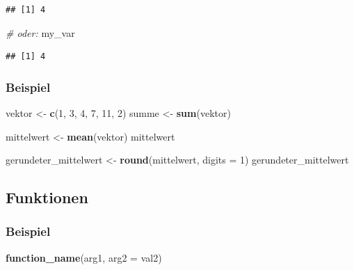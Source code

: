 \documentclass[
]{article}
\newenvironment{Shaded}{\begin{snugshade}}{\end{snugshade}}
\newcommand{\AttributeTok}[1]{\textcolor[rgb]{0.13,0.29,0.53}{#1}}
\newcommand{\CommentTok}[1]{\textcolor[rgb]{0.56,0.35,0.01}{\textit{#1}}}
\newcommand{\DecValTok}[1]{\textcolor[rgb]{0.00,0.00,0.81}{#1}}
\newcommand{\FunctionTok}[1]{\textcolor[rgb]{0.13,0.29,0.53}{\textbf{#1}}}
\newcommand{\NormalTok}[1]{#1}
\newcommand{\OtherTok}[1]{\textcolor[rgb]{0.56,0.35,0.01}{#1}}
\begin{document}
\begin{verbatim}
## [1] 4
\end{verbatim}

\begin{Shaded}
\begin{Highlighting}[]
\CommentTok{\# oder:}
\NormalTok{my\_var}
\end{Highlighting}
\end{Shaded}

\begin{verbatim}
## [1] 4
\end{verbatim}

\hypertarget{beispiel}{%
\subsubsection{Beispiel}\label{beispiel}}

\begin{Shaded}
\begin{Highlighting}[]
\NormalTok{vektor }\OtherTok{\textless{}{-}} \FunctionTok{c}\NormalTok{(}\DecValTok{1}\NormalTok{, }\DecValTok{3}\NormalTok{, }\DecValTok{4}\NormalTok{, }\DecValTok{7}\NormalTok{, }\DecValTok{11}\NormalTok{, }\DecValTok{2}\NormalTok{)}
\NormalTok{summe }\OtherTok{\textless{}{-}} \FunctionTok{sum}\NormalTok{(vektor)}

\NormalTok{mittelwert }\OtherTok{\textless{}{-}} \FunctionTok{mean}\NormalTok{(vektor)}
\NormalTok{mittelwert}

\NormalTok{gerundeter\_mittelwert }\OtherTok{\textless{}{-}} \FunctionTok{round}\NormalTok{(mittelwert, }\AttributeTok{digits =} \DecValTok{1}\NormalTok{)}
\NormalTok{gerundeter\_mittelwert}
\end{Highlighting}
\end{Shaded}

\hypertarget{funktionen}{%
\subsection{Funktionen}\label{funktionen}}

\hypertarget{beispiel-1}{%
\subsubsection{Beispiel}\label{beispiel-1}}

\begin{Shaded}
\begin{Highlighting}[]
\FunctionTok{function\_name}\NormalTok{(arg1, }\AttributeTok{arg2 =}\NormalTok{ val2)}
\end{Highlighting}
\end{Shaded}
\end{document}
